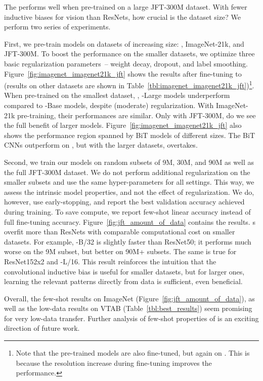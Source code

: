The \oursfull performs well when pre-trained on a large JFT-300M dataset. 
With fewer inductive biases for vision than ResNets, how crucial is the dataset size?
We perform two series of experiments.

First, we pre-train \oursabbrv{} models on datasets of increasing size: \imagenet, ImageNet-21k, and JFT-300M.
To boost the performance on the smaller datasets, we optimize three basic regularization parameters~-- weight decay, dropout, and label smoothing.
Figure~\ref{fig:imagenet_imagenet21k_jft} shows the results after fine-tuning to \imagenet (results on other datasets are shown in Table~\ref{tbl:imagenet_imagenet21k_jft})\footnote{Note that the \imagenet pre-trained models are also fine-tuned, but again on \imagenet. This is because the resolution increase during fine-tuning improves the performance.}.
When pre-trained on  the smallest dataset, \imagenet, \oursabbrv{}-Large models underperform compared to \oursabbrv{}-Base models, despite (moderate) regularization.
With ImageNet-21k pre-training, their  performances are similar.
Only with JFT-300M, do we see the full benefit of larger models.
Figure~\ref{fig:imagenet_imagenet21k_jft} also shows the performance region spanned by BiT models of different sizes.
The BiT CNNs outperform \oursabbrv{} on \imagenet, but with the larger datasets, \oursabbrv{} overtakes.

Second, we train our models on random subsets of 9M, 30M, and 90M as well as the full JFT-300M dataset.
We do not perform additional regularization on the smaller subsets and use the same hyper-parameters for all settings.
This way, we assess the intrinsic model properties, and not the effect of regularization.
We do, however, use early-stopping, and report the best validation accuracy achieved during training.
To save compute, we report few-shot linear accuracy instead of full fine-tuning accuracy.
Figure~\ref{fig:jft_amount_of_data} contains the results.
\oursfull{}s overfit more than ResNets with comparable computational cost on smaller datasets. 
For example, \oursabbrv-B/32 is slightly faster than ResNet50; it performs much worse on the 9M subset, but better on 90M+ subsets.
The same is true for ResNet152x2 and \oursabbrv-L/16.
This result reinforces the intuition that the convolutional inductive bias is useful for smaller datasets, but for larger ones, learning the relevant patterns directly from data is sufficient, even beneficial.

Overall, the few-shot results on ImageNet (Figure~\ref{fig:jft_amount_of_data}), as well as the low-data results on VTAB (Table~\ref{tbl:best_results}) seem promising for very low-data transfer. Further analysis of few-shot properties of \oursabbrv{} is an exciting direction of future work.






